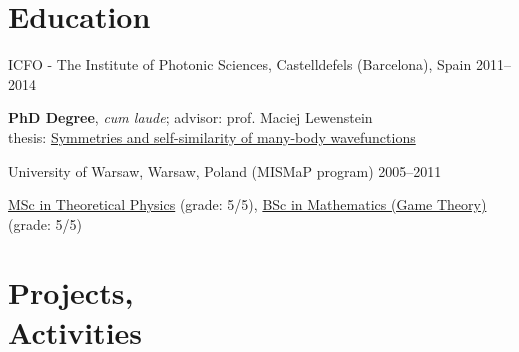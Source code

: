 \documentclass[margin,line]{resume}
\begin{document}
\begin{resume}
    \section{\mysidestyle Education}

    ICFO - The Institute of Photonic Sciences,  Castelldefels (Barcelona), Spain \hfill { 2011--2014}\\
   \begin{list2}
        \vspace*{-4mm}
        \item \textbf{PhD Degree}, \emph{cum laude}; advisor: prof. Maciej Lewenstein\\
            thesis: \href{http://arxiv.org/abs/1412.6796}{Symmetries and self-similarity of many-body wavefunctions}
    \end{list2}
    \vspace*{-4mm}
    University of Warsaw, Warsaw, Poland (MISMaP program) \hfill { 2005--2011}\\
    \begin{list2}
      \vspace*{-4mm}
      \item \href{http://migdal.wikidot.com/en:collective-decoherence}{MSc in Theoretical Physics} (grade: 5/5),
      \href{http://migdal.wikidot.com/en:mafia}{BSc in Mathematics (Game Theory)} (grade: 5/5)
    \end{list2}


    \section{\mysidestyle Projects,\\Activities}


\end{resume}
\end{document}
